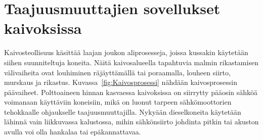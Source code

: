 \documentclass[finnish,12pt,a4paper,pdftex,elec,utf8]{aaltothesis}
\begin{document}





\clearpage


\section{Taajuusmuuttajien sovellukset kaivoksissa}
Kaivosteollisuus käsittää laajan joukon aliprosesseja, joissa kussakin käytetään siihen suunniteltuja koneita. Näitä kaivosalueella tapahtuvia malmin rikastamisen välivaiheita ovat louhiminen räjäyttämällä tai poraamalla, louheen siirto, murskaus ja rikastus. Kuvassa~\ref{fig:Kaivosprosessi} nähdään kaivosprosessin päävaiheet. Polttoaineen hinnan kasvaessa kaivoksissa on siirrytty pääosin sähköä voimanaan käyttäviin koneisiin, mikä on luonut tarpeen sähkömoottorien tehokkaalle ohjaukselle taajuusmuuttajilla. Nykyään dieselkoneita käytetään lähinnä vain liikkuvassa kalustossa, mihin sähkönsiirto johdinta pitkin tai akuston avulla voi olla hankalaa tai epäkannattavaa.
\\\\ 
\end{document}
